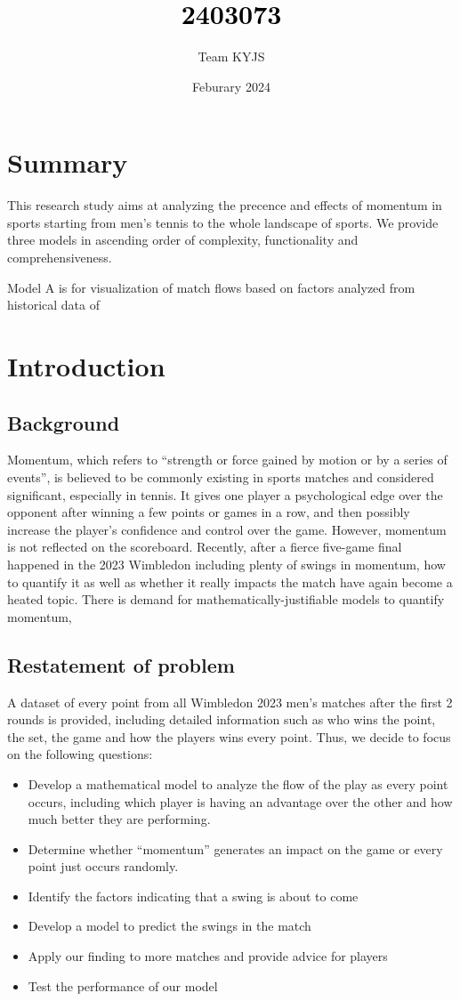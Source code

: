 \documentclass[12pt, a4paper]{article}
\title{\textcolor{black}{2403073}\\ \vspace{12pt}{Magic Momentum: Unveiling game-changer dynamics}}
\author{Team KYJS}
\date{Feburary 2024}
\begin{document}
\maketitle
\section*{Summary}
This research study aims at analyzing the precence and effects of momentum in sports starting from men's tennis to the whole landscape of sports. We provide three models in ascending order of complexity, functionality and comprehensiveness.

Model A is for visualization of match flows based on factors analyzed from historical data of 
\newpage
\section{Introduction}
\subsection{Background}
Momentum, which refers to “strength or force gained by motion or by a series of events”, is believed to be commonly existing in sports matches and considered significant, especially in tennis. It gives one player a psychological edge over the opponent after winning a few points or games in a row, and then possibly increase the player’s confidence and control over the game. However, momentum is not reflected on the scoreboard. Recently, after a fierce five-game final happened in the 2023 Wimbledon including plenty of swings in momentum, how to quantify it as well as whether it really impacts the match have again become a heated topic.    There is demand for mathematically-justifiable models to quantify momentum,  

\subsection{Restatement of problem}
A dataset of every point from all Wimbledon 2023 men’s matches after the first 2 rounds is provided, including detailed information such as who wins the point, the set, the game and how the players wins every point. Thus, we decide to focus on the following questions:
\begin{itemize}
\item Develop a mathematical model to analyze the flow of the play as every point occurs, including which player is having an advantage over the other and how much better they are performing.
\item Determine whether “momentum” generates an impact on the game or every point just occurs randomly.
\item Identify the factors indicating that a swing is about to come
\item Develop a model to predict the swings in the match
\item Apply our finding to more matches and provide advice for players
\item Test the performance of our model
\end{itemize}
\end{document}

